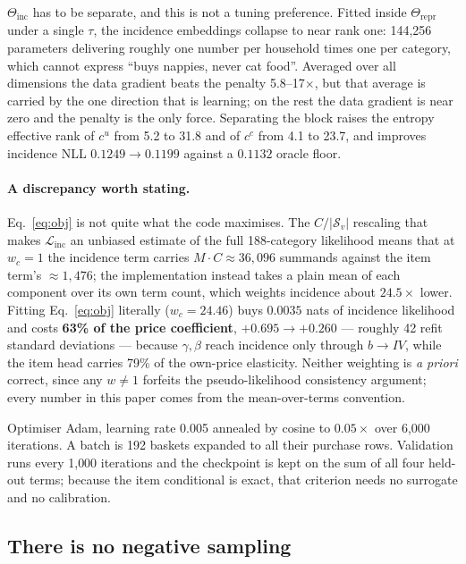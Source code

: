 \documentclass[11pt]{article}
\begin{document}
$\Theta_{\text{inc}}$ has to be separate, and this is not a tuning preference. Fitted inside
$\Theta_{\text{repr}}$ under a single $\tau$, the incidence embeddings collapse to near rank
one: 144{,}256 parameters delivering roughly one number per household times one per
category, which cannot express ``buys nappies, never cat food''. Averaged over all
dimensions the data gradient beats the penalty 5.8--17$\times$, but that average is carried
by the one direction that is learning; on the rest the data gradient is near zero and the
penalty is the only force. Separating the block raises the entropy effective rank of $c^u$
from 5.2 to 31.8 and of $c^c$ from 4.1 to 23.7, and improves incidence NLL
$0.1249\to0.1199$ against a $0.1132$ oracle floor.

\paragraph{A discrepancy worth stating.} Eq.~\ref{eq:obj} is not quite what the code
maximises. The $C/|\mathcal S_v|$ rescaling that makes $\mathcal L_{\text{inc}}$ an unbiased
estimate of the full 188-category likelihood means that at $w_c=1$ the incidence term
carries $M\cdot C\approx 36{,}096$ summands against the item term's ${\approx}1{,}476$; the
implementation instead takes a plain mean of each component over its own term count, which
weights incidence about $24.5\times$ lower. Fitting Eq.~\ref{eq:obj} literally
($w_c=24.46$) buys $0.0035$ nats of incidence likelihood and costs \textbf{63\% of the price
coefficient}, $+0.695\to+0.260$ --- roughly 42 refit standard deviations --- because
$\gamma,\beta$ reach incidence only through $b\to IV$, while the item head carries 79\% of
the own-price elasticity. Neither weighting is \emph{a priori} correct, since any $w\neq1$
forfeits the pseudo-likelihood consistency argument; every number in this paper comes from
the mean-over-terms convention.

Optimiser Adam, learning rate 0.005 annealed by cosine to $0.05\times$ over 6{,}000
iterations. A batch is 192 baskets expanded to all their purchase rows. Validation runs
every 1{,}000 iterations and the checkpoint is kept on the sum of all four held-out terms;
because the item conditional is exact, that criterion needs no surrogate and no
calibration.

\subsection{There is no negative sampling}
\label{sec:negsamp}
\end{document}

